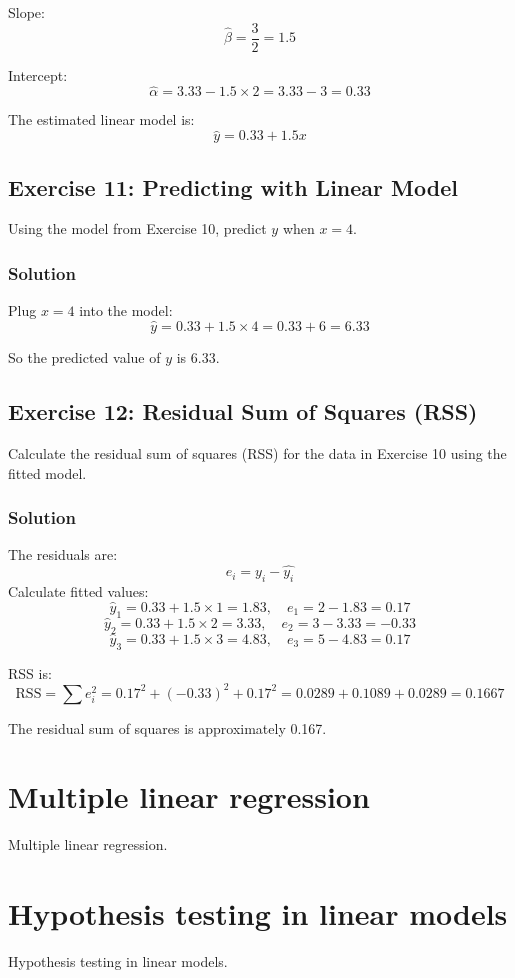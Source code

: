 \documentclass{book}
\begin{document}
Slope:
\[
\hat{\beta} = \frac{3}{2} = 1.5
\]

Intercept:
\[
\hat{\alpha} = 3.33 - 1.5 \times 2 = 3.33 - 3 = 0.33
\]

The estimated linear model is:
\[
\hat{y} = 0.33 + 1.5 x
\]

\subsection*{Exercise 11: Predicting with Linear Model}
Using the model from Exercise 10, predict $y$ when $x=4$.

\subsubsection*{Solution}
Plug $x=4$ into the model:
\[
\hat{y} = 0.33 + 1.5 \times 4 = 0.33 + 6 = 6.33
\]

So the predicted value of $y$ is 6.33.

\subsection*{Exercise 12: Residual Sum of Squares (RSS)}
Calculate the residual sum of squares (RSS) for the data in Exercise 10 using the fitted model.

\subsubsection*{Solution}
The residuals are:
\[
e_i = y_i - \hat{y_i}
\]
Calculate fitted values:
\[
\hat{y}_1 = 0.33 + 1.5 \times 1 = 1.83, \quad e_1 = 2 - 1.83 = 0.17
\]
\[
\hat{y}_2 = 0.33 + 1.5 \times 2 = 3.33, \quad e_2 = 3 - 3.33 = -0.33
\]
\[
\hat{y}_3 = 0.33 + 1.5 \times 3 = 4.83, \quad e_3 = 5 - 4.83 = 0.17
\]

RSS is:
\[
\text{RSS} = \sum e_i^2 = 0.17^2 + (-0.33)^2 + 0.17^2 = 0.0289 + 0.1089 + 0.0289 = 0.1667
\]

The residual sum of squares is approximately 0.167.

\newpage

\section{Multiple linear regression}
Multiple linear regression.

\newpage

\section{Hypothesis testing in linear models}
Hypothesis testing in linear models.
\end{document}
